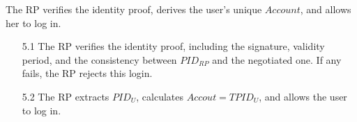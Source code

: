 The RP verifies the identity proof, derives the user's unique $Account$, and allows her to log in.
\vspace{-\topsep}
\begin{itemize}
\item[5.1] The RP verifies the identity proof, including the signature, validity period, and the consistency between $PID_{RP}$ and the negotiated one. If any fails, the RP rejects this login.
\vspace{-\topsep}
\item [5.2] The RP extracts $PID_U$, calculates $Accout = T{PID_U}$, and allows the user to log in.
\end{itemize}
\vspace{-\topsep}



